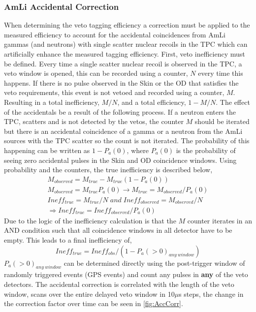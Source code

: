 \subsubsection{AmLi Accidental Correction}\label{sec:AmLiAccCorrection}
When determining the veto tagging efficiency a correction must be applied to the measured efficiency to account for the accidental coincidences from AmLi gammas (and neutrons) with single scatter nuclear recoils in the TPC which can artificially enhance the measured tagging efficiency.
First, veto inefficiency must be defined. Every time a single scatter nuclear recoil is observed in the TPC, a veto window is opened, this can be recorded using a counter, $N$ every time this happens.
If there is no pulse observed in the Skin or the OD that satisfies the veto requirements, this event is not vetoed and recorded using a counter, $M$. Resulting in a total inefficiency, $M/N$, and a total efficiency, $1-M/N$.
The effect of the accidentals be a result of the following process.
If a neutron enters the TPC, scatters and is not detected by the vetos, the counter $M$ should be iterated but there is an accidental coincidence of a gamma or a neutron from the AmLi sources with the TPC scatter so the count is not iterated.
The probability of this happening can be written as $1-P_a(0)$, where $P_a(0)$ is the probability of seeing zero accidental pulses in the Skin and OD coincidence windows.
Using probability and the counters, the true inefficiency is described below,
\begin{gather*}
	M_{observed}=M_{true}-M_{true}(1-P_a(0)) \\
	M_{observed}=M_{true}P_a(0)\rightarrow M_{true}=M_{observed}/P_a(0)\\
	Ineff_{true}=M_{true}/N\;and\;Ineff_{observed}=M_{observed}/N\\
	\Rightarrow Ineff_{true}=Ineff_{observed}/P_a(0)
\end{gather*}
Due to the logic of the inefficiency calculation is that the $M$ counter iterates in an AND condition such that all coincidence windows in all detector have to be empty.
This leads to a final inefficiency of,
\begin{equation}
	Ineff_{true} = Ineff_{obs}  / (1 - P_a(>0)_{any\:window})
\end{equation}
$P_a(>0)_{any\:window}$ can be determined directly using the post-trigger window of randomly triggered events (GPS events) and count any pulses in \textbf{any} of the veto detectors.
The accidental correction is correlated with the length of the veto window, scans over the entire delayed veto window in 10$\mu$s steps, the change in the correction factor over time can be seen in \autoref{fig:AccCorr}.
